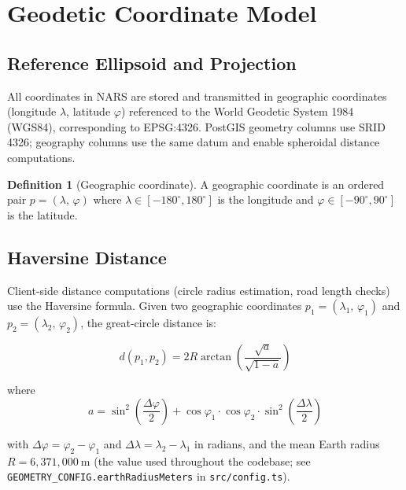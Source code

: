 \documentclass[12pt,a4paper]{article}
\theoremstyle{definition}
\newtheorem{definition}{Definition}[section]
\theoremstyle{plain}
\theoremstyle{remark}
\newcommand{\coord}[2]{(#1,\,#2)}
\begin{document}
\section{Geodetic Coordinate Model}
\label{sec:geodesy}

\subsection{Reference Ellipsoid and Projection}

All coordinates in NARS are stored and transmitted in geographic
coordinates (longitude $\lambda$, latitude $\varphi$) referenced to the
World Geodetic System 1984 (WGS84), corresponding to EPSG:4326. PostGIS
geometry columns use SRID 4326; geography columns use the same datum and
enable spheroidal distance computations.

\begin{definition}[Geographic coordinate]
A geographic coordinate is an ordered pair $p = \coord{\lambda}{\varphi}$
where $\lambda \in [-180^\circ, 180^\circ]$ is the longitude and
$\varphi \in [-90^\circ, 90^\circ]$ is the latitude.
\end{definition}

\subsection{Haversine Distance}

Client-side distance computations (circle radius estimation, road length
checks) use the Haversine formula. Given two geographic coordinates
$p_1 = \coord{\lambda_1}{\varphi_1}$ and $p_2 = \coord{\lambda_2}{\varphi_2}$,
the great-circle distance is:

\begin{equation}
  d(p_1, p_2) = 2 R \arctan\!\left(\frac{\sqrt{a}}{\sqrt{1 - a}}\right)
  \label{eq:haversine}
\end{equation}

where
\begin{equation}
  a = \sin^2\!\left(\frac{\Delta\varphi}{2}\right)
    + \cos\varphi_1 \cdot \cos\varphi_2 \cdot \sin^2\!\left(\frac{\Delta\lambda}{2}\right)
  \label{eq:haversine_a}
\end{equation}

with $\Delta\varphi = \varphi_2 - \varphi_1$ and
$\Delta\lambda = \lambda_2 - \lambda_1$ in radians, and the mean Earth
radius $R = 6{,}371{,}000\ \mathrm{m}$ (the value used throughout the
codebase; see \texttt{GEOMETRY\_CONFIG.earthRadiusMeters} in
\texttt{src/config.ts}).
\end{document}
